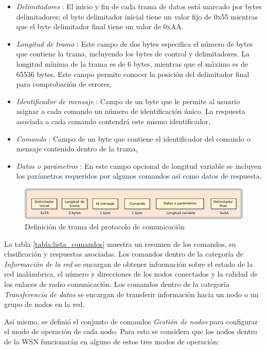 \begin{itemize}
	\item \textit{Delimitadores} : El inicio y fin de cada trama de datos está marcado por bytes delimitadores; el byte delimitador inicial tiene un valor fijo de 0x55 mientras que el byte delimitador final tiene un valor de 0xAA.	
	\item \textit{Longitud de trama} : Este campo de dos bytes especifica el número de bytes que contiene la trama, incluyendo los bytes de control y delimitadores. La longitud mínima de la trama es de 6 bytes, mientras que el máximo es de 65536 bytes. Este campo permite conocer la posición del delimitador final para comprobación de errores, 
	\item \textit{Identificador de mensaje} : Campo de un byte que le permite al usuario asignar a cada comando un número de identificación único. La respuesta asociada a cada comando contendrá este mismo identificador,
	\item \textit{Comando} : Campo de un byte que contiene el identificador del comando o mensaje contenido dentro de la trama,
	\item \textit{Datos o parámetros} : En este campo opcional de longitud variable se incluyen los parámetros requeridos por algunos comandos así como datos de respuesta. 
\end{itemize}

\begin{figure}
	\centering
	\includegraphics[scale=0.4]{capitulo_3_imgs/protocolo.pdf}
	\caption{Definición de trama del protocolo de comunicación}
	\label{fig:protocolo}
\end{figure}

La tabla \ref{tabla:lista_comandos} muestra un resumen de los comandos, su clasificación y respuestas asociadas. Los comandos dentro de la categoría de \textit{Información de la red} se encargan de obtener información sobre el estado de la red inalámbrica, el número y direcciones de los nodos conectados y la calidad de los enlaces de radio comunicación. Los comandos dentro de la categoría \textit{Transferencia de datos} se encargan de transferir información hacia un nodo o un grupo de nodos en la red. 

Así mismo, se definió el conjunto de comandos \textit{Gestión de nodos} para configurar el modo de operación de cada nodo. Para esto se considera que los nodos dentro de la WSN funcionarán en alguno de estos tres modos de operación: 

